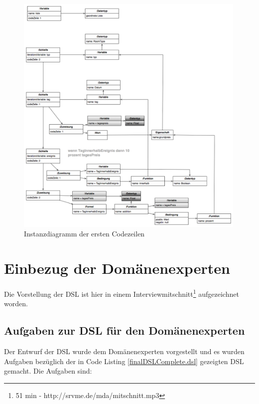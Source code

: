 \documentclass[11pt,english,ngerman, headsepline]{scrreprt}
\begin{document}
\begin{figure}[h!]
	\begin{center}
	\includegraphics[width=0.99\textwidth]{pics/mmInstanz}
	\end{center}
	\caption{Instanzdiagramm der ersten Codezeilen}
	\label{mmInstanz.png}
\end{figure}
 \clearpage
 
\chapter{Einbezug der Domänenexperten}\label{vor}

Die Vorstellung der DSL ist hier in einem Interviewmitschnitt\footnote{51 min -
http://srvme.de/mda/mitschnitt.mp3} aufgezeichnet worden.


\section{Aufgaben zur DSL für den Domänenexperten}

Der Entwurf der DSL wurde dem Domänenexperten vorgestellt und es wurden
Aufgaben bezüglich der in Code Listing \ref{finalDSLComplete.dsl} gezeigten DSL gemacht.
Die Aufgaben sind:
\end{document}
